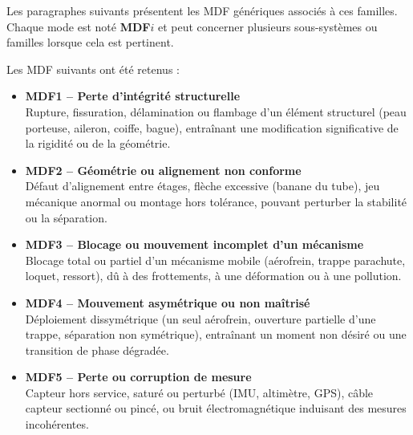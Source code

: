 Les paragraphes suivants présentent les \acrshort{MDF} génériques associés à ces familles. Chaque mode est noté
\textbf{\acrshort{MDF}$i$} et peut concerner plusieurs sous-systèmes ou familles lorsque cela est pertinent.


Les \acrlong{MDF} suivants ont été retenus :

\begin{itemize}
    \item \textbf{\acrshort{MDF}1 – Perte d’intégrité structurelle} \\
    Rupture, fissuration, délamination ou flambage d’un élément structurel (peau porteuse, aileron, coiffe, bague),
    entraînant une modification significative de la rigidité ou de la géométrie.\\

    \item \textbf{\acrshort{MDF}2 – Géométrie ou alignement non conforme} \\
    Défaut d’alignement entre étages, flèche excessive (\og banane\fg{} du tube), jeu mécanique anormal ou montage hors
    tolérance, pouvant perturber la stabilité ou la séparation.\\

    \item \textbf{\acrshort{MDF}3 – Blocage ou mouvement incomplet d’un mécanisme} \\
    Blocage total ou partiel d’un mécanisme mobile (aérofrein, trappe parachute, loquet, ressort), dû à des frottements, à une
    déformation ou à une pollution.\\

    \item \textbf{\acrshort{MDF}4 – Mouvement asymétrique ou non maîtrisé} \\
    Déploiement dissymétrique (un seul aérofrein, ouverture partielle d’une trappe, séparation non symétrique), entraînant un
    moment non désiré ou une transition de phase dégradée.\\

    \item \textbf{\acrshort{MDF}5 – Perte ou corruption de mesure} \\
    Capteur hors service, saturé ou perturbé (IMU, altimètre, GPS), câble capteur sectionné ou pincé, ou bruit électromagnétique
    induisant des mesures incohérentes.\\


\end{itemize}
